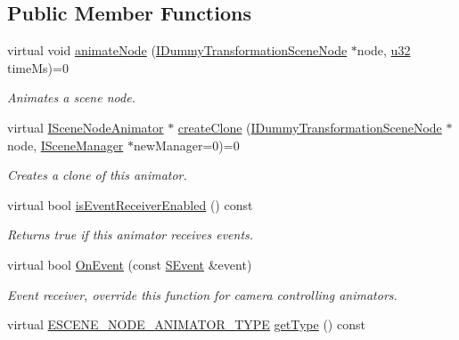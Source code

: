 \subsection*{Public Member Functions}
\begin{DoxyCompactItemize}
\item 
virtual void \hyperlink{classirr_1_1scene_1_1ISceneNodeAnimator_ab7fe10093baa860ac6fbd0b805f85cd7}{animate\+Node} (\hyperlink{classirr_1_1scene_1_1IDummyTransformationSceneNode}{I\+Dummy\+Transformation\+Scene\+Node} $\ast$node, \hyperlink{namespaceirr_a0416a53257075833e7002efd0a18e804}{u32} time\+Ms)=0
\begin{DoxyCompactList}\small\item\em Animates a scene node. \end{DoxyCompactList}\item 
virtual \hyperlink{classirr_1_1scene_1_1ISceneNodeAnimator}{I\+Scene\+Node\+Animator} $\ast$ \hyperlink{classirr_1_1scene_1_1ISceneNodeAnimator_a0f066f3764f0bc4c74c516fcc67ed1d5}{create\+Clone} (\hyperlink{classirr_1_1scene_1_1IDummyTransformationSceneNode}{I\+Dummy\+Transformation\+Scene\+Node} $\ast$node, \hyperlink{classirr_1_1scene_1_1ISceneManager}{I\+Scene\+Manager} $\ast$new\+Manager=0)=0
\begin{DoxyCompactList}\small\item\em Creates a clone of this animator. \end{DoxyCompactList}\item 
virtual bool \hyperlink{classirr_1_1scene_1_1ISceneNodeAnimator_a75c9e4eb1fa1af868034678fdcdbe15b}{is\+Event\+Receiver\+Enabled} () const 
\begin{DoxyCompactList}\small\item\em Returns true if this animator receives events. \end{DoxyCompactList}\item 
virtual bool \hyperlink{classirr_1_1scene_1_1ISceneNodeAnimator_aca20b841bb586cd9654464b001a7b6aa}{On\+Event} (const \hyperlink{structirr_1_1SEvent}{S\+Event} \&event)\hypertarget{classirr_1_1scene_1_1ISceneNodeAnimator_aca20b841bb586cd9654464b001a7b6aa}{}\label{classirr_1_1scene_1_1ISceneNodeAnimator_aca20b841bb586cd9654464b001a7b6aa}

\begin{DoxyCompactList}\small\item\em Event receiver, override this function for camera controlling animators. \end{DoxyCompactList}\item 
virtual \hyperlink{namespaceirr_1_1scene_a327a1e43872705cf8f3f3342fb307d19}{E\+S\+C\+E\+N\+E\+\_\+\+N\+O\+D\+E\+\_\+\+A\+N\+I\+M\+A\+T\+O\+R\+\_\+\+T\+Y\+PE} \hyperlink{classirr_1_1scene_1_1ISceneNodeAnimator_aeed52b1fb289dcf456867b3916076cac}{get\+Type} () const \hypertarget{classirr_1_1scene_1_1ISceneNodeAnimator_aeed52b1fb289dcf456867b3916076cac}{}\label{classirr_1_1scene_1_1ISceneNodeAnimator_aeed52b1fb289dcf456867b3916076cac}


\end{DoxyCompactItemize}
